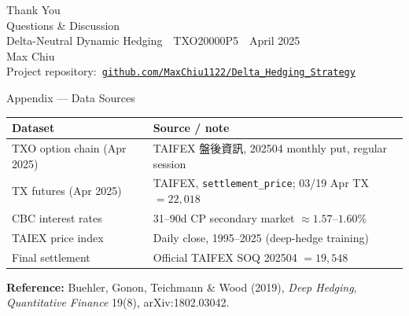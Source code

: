 \documentclass[aspectratio=169,t]{beamer}
\begin{document}
\begin{frame}
  \centering
  \vspace{1.4cm}
  {\Huge\textcolor{primary}{Thank You}}\\[0.6em]
  {\large Questions \& Discussion}\\[1.4em]
  {\small Delta-Neutral Dynamic Hedging \,\textbar\, TXO20000P5 \,\textbar\, April 2025}\\[0.3em]
  {\small Max Chiu}\\[0.4em]
  {\small Project repository:\ \href{https://github.com/MaxChiu1122/Delta_Hedging_Strategy}{\texttt{github.com/MaxChiu1122/Delta\_Hedging\_Strategy}}}
\end{frame}

\appendix
\begin{frame}[noframenumbering]{Appendix --- Data Sources}
  \small
  \begin{tabular}{ll}
    \toprule
    \textbf{Dataset} & \textbf{Source / note} \\
    \midrule
    TXO option chain (Apr 2025) & TAIFEX 盤後資訊, 202504 monthly put, regular session \\
    TX futures (Apr 2025) & TAIFEX, \texttt{settlement\_price}; 03/19 Apr TX $=22{,}018$ \\
    CBC interest rates & 31--90d CP secondary market $\approx 1.57$--$1.60\%$ \\
    TAIEX price index & Daily close, 1995--2025 (deep-hedge training) \\
    Final settlement & Official TAIFEX SOQ 202504 $=19{,}548$ \\
    \bottomrule
  \end{tabular}
  \vspace{0.8em}

  \textbf{Reference:} Buehler, Gonon, Teichmann \& Wood (2019), \emph{Deep Hedging}, \emph{Quantitative Finance} 19(8), arXiv:1802.03042.
\end{frame}
\end{document}
